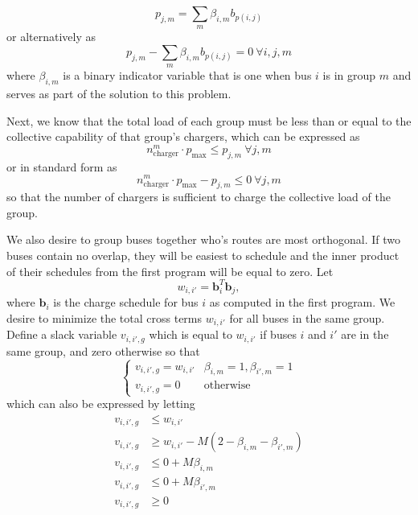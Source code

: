 \begin{equation*}
 p_{j,m} = \sum_m\beta_{i,m}b_{p(i,j)}
\end{equation*}
or alternatively as
\begin{equation}
	p_{j,m} - \sum_m\beta_{i,m}b_{p(i,j)} = 0 \ \forall i,j,m
\end{equation}
where $\beta_{i,m}$ is a binary indicator variable that is one when bus $i$ is in group $m$ and serves as part of the solution to this problem. 
\par Next, we know that the total load of each group must be less than or equal to the collective capability of that group's chargers, which can be expressed as
\begin{equation*}
	n^m_{\text{charger}}\cdot p_{\text{max}} \le p_{j,m} \ \forall j,m
\end{equation*}
or in standard form as 
\begin{equation}
	n^m_{\text{charger}}\cdot p_{\text{max}} - p_{j,m} \le 0\ \forall j,m
\end{equation}
so that the number of chargers is sufficient to charge the collective load of the group. 
\par We also desire to group buses together who's routes are most orthogonal. If two buses contain no overlap, they will be easiest to schedule and the inner product of their schedules from the first program will be equal to zero. Let 
\begin{equation*}
w_{i,i'} = \mathbf{b}_i^T\mathbf{b}_j,
\end{equation*}
where $\mathbf{b}_i$ is the charge schedule for bus $i$ as computed in the first program. We desire to minimize the total cross terms $w_{i,i'}$ for all buses in the same group.  Define a slack variable $v_{i,i',g}$ which is equal to $w_{i,i'}$ if buses $i$ and $i'$ are in the same group, and zero otherwise so that
\begin{equation*}
	\begin{cases}
		v_{i,i',g} = w_{i,i'} & \beta_{i,m} = 1, \beta_{i',m} = 1 \\
		v_{i,i',g} = 0 & \text{otherwise}
	\end{cases}
\end{equation*}
which can also be expressed by letting
\begin{equation*}\begin{aligned}
	v_{i,i',g} &\le w_{i,i'} \\
	v_{i,i',g} &\ge w_{i,i'} - M(2 - \beta_{i,m} - \beta_{i',m}) \\
	v_{i,i',g} &\le 0 + M\beta_{i,m} \\
	v_{i,i',g} &\le 0 + M\beta_{i',m} \\
	v_{i,i',g} &\ge 0  
\end{aligned}\end{equation*}
